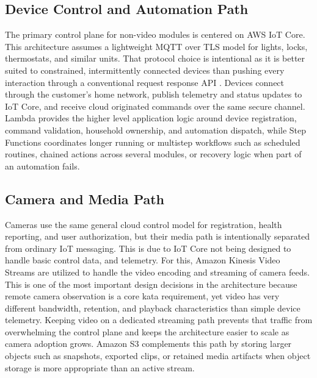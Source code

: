 \subsection{Device Control and Automation Path}

The primary control plane for non-video modules is centered on AWS IoT Core. This architecture assumes a lightweight MQTT over TLS model for lights, locks, thermostats, and similar units. That protocol choice is intentional as it is better suited to constrained, intermittently connected devices than pushing every interaction through a conventional request response API \cite{webbylab}. Devices connect through the customer's home network, publish telemetry and status updates to IoT Core, and receive cloud originated commands over the same secure channel. Lambda provides the higher level application logic around device registration, command validation, household ownership, and automation dispatch, while Step Functions coordinates longer running or multistep workflows such as scheduled routines, chained actions across several modules, or recovery logic when part of an automation fails.

\subsection{Camera and Media Path}

Cameras use the same general cloud control model for registration, health reporting, and user authorization, but their media path is intentionally separated from ordinary IoT messaging. This is due to IoT Core not being designed to handle basic control data, and telemetry. For this, Amazon Kinesis Video Streams are utilized to handle the video encoding and streaming of camera feeds. This is one of the most important design decisions in the architecture because remote camera observation is a core kata requirement, yet video has very different bandwidth, retention, and playback characteristics than simple device telemetry. Keeping video on a dedicated streaming path prevents that traffic from overwhelming the control plane and keeps the architecture easier to scale as camera adoption grows. Amazon S3 complements this path by storing larger objects such as snapshots, exported clips, or retained media artifacts when object storage is more appropriate than an active stream.

